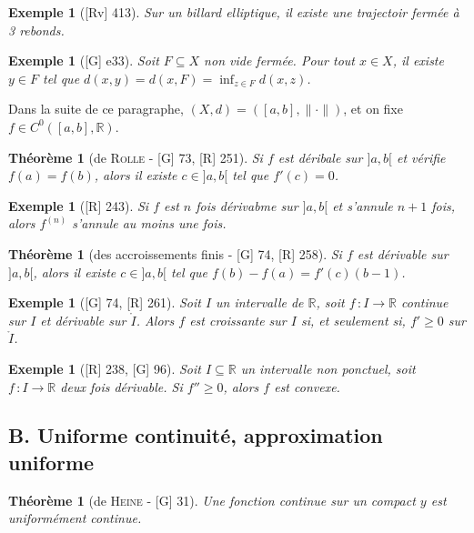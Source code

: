 \documentclass[10pt, a4paper, parskip=full, twoside, twocolumn]{report}
\newtheorem{theorem}[definition]{Théorème}
\newtheorem{example}[definition]{Exemple}
\newcommand{\IR}{\mathbb{R}}
\begin{document}
\begin{example}[\textnormal{[Rv] 413}]
	Sur un billard elliptique, il existe une trajectoir fermée à 3 rebonds.
\end{example}

\begin{example}[\textnormal{[G] e33}]
	Soit $F\subseteq X$ non vide fermée. Pour tout $x\in X$, il existe $y\in F$ tel que $d(x,y)=d(x,F)=\inf_{z\in F} d(x,z)$.
\end{example}

\textcolor{paragraphtext}{Dans la suite de ce paragraphe, $(X,d) = ([a,b], \|\cdot\|)$, et on fixe $f\in C^0([a,b], \IR)$.}

\begin{theorem}[de \textsc{Rolle} - \textnormal{[G] 73, [R] 251}]
	Si $f$ est déribale sur $]a,b[$ et vérifie $f(a)=f(b)$, alors il existe $c\in ]a,b[$ tel que $f'(c)=0$.
\end{theorem}

\begin{example}[\textnormal{[R] 243}]
	Si $f$ est $n$ fois dérivabme sur $]a,b[$ et s'annule $n+1$ fois, alors $f^{(n)}$ s'annule au moins une fois.
\end{example}

\begin{theorem}[des accroissements finis - \textnormal{[G] 74, [R] 258}]
	Si $f$ est dérivable sur $]a,b[$, alors il existe $c\in ]a,b[$ tel que $f(b)-f(a) = f'(c)(b-1)$.
\end{theorem}

\begin{example}[\textnormal{[G] 74, [R] 261}]
	Soit $I$ un intervalle de $\IR$, soit $f\,\colon I\to \IR$ continue sur $I$ et dérivable sur $\mathring{I}$. Alors $f$ est croissante sur $I$ si, et seulement si, $f'\geq 0$ sur $\mathring{I}$.
\end{example}

\begin{example}[\textnormal{[R] 238, [G] 96}]
	Soit $I\subseteq \IR$ un intervalle non ponctuel, soit $f\,\colon I\to\IR$ deux fois dérivable.
	Si $f''\geq 0$, alors $f$ est convexe.
\end{example}


\subsection*{B. Uniforme continuité, approximation uniforme}

\begin{theorem}[de \textsc{Heine} - \textnormal{[G] 31}]
	Une fonction continue sur un compact $y$ est uniformément continue.
\end{theorem}
\end{document}
